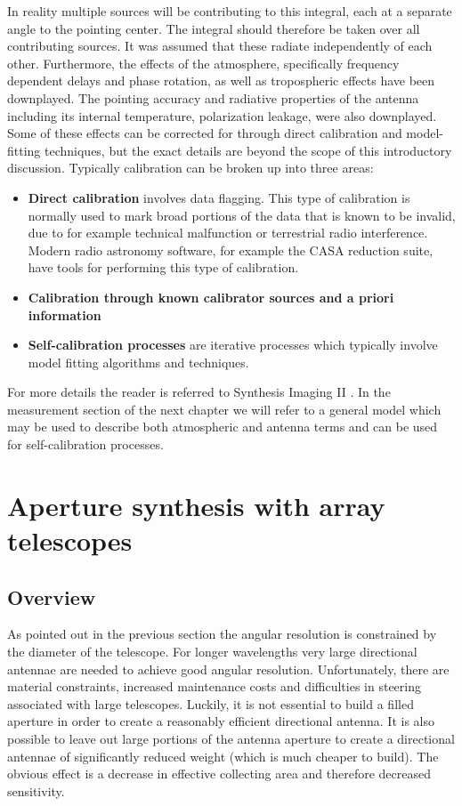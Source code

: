 In reality multiple sources will be contributing to this integral, each at a separate angle to the pointing center. The integral should therefore be taken over 
all contributing sources. It was assumed that these radiate independently of each other. Furthermore, the effects of the atmosphere, specifically frequency 
dependent delays and phase rotation, as well as tropospheric effects have been downplayed. The pointing accuracy and radiative properties of the antenna including its internal 
temperature, polarization leakage, were also downplayed. Some of these effects can be corrected for through direct calibration and model-fitting techniques, 
but the exact details are beyond the scope of this introductory discussion. Typically calibration can be broken up into three areas:
\begin{itemize}
 \item \textbf{Direct calibration} involves data flagging. This type of calibration is normally used to mark broad portions of the data that is known to be invalid, due to for example
 technical malfunction or terrestrial radio interference. Modern radio astronomy software, for example the CASA reduction suite, have tools for performing this type of calibration.
 \item \textbf{Calibration through known calibrator sources and a priori information} 
 \item \textbf{Self-calibration processes} are iterative processes which typically involve model fitting algorithms and techniques.
\end{itemize}

For more details the reader is referred to Synthesis Imaging II \cite[Lectures 3, 5, 8 and 10]{taylor1999synthesis}. In the measurement section of the next chapter
we will refer to a general model which may be used to describe both atmospheric and antenna terms and can be used for self-calibration processes.

\section{Aperture synthesis with array telescopes}
\subsection{Overview}
As pointed out in the previous section the angular resolution is constrained by the diameter of the telescope. For longer 
wavelengths very large directional antennae are needed to achieve good angular resolution. Unfortunately,
there are material constraints, increased maintenance costs and difficulties in steering associated with large telescopes. 
Luckily, it is not essential to build a filled aperture in order to create a reasonably efficient directional antenna. It is 
also possible to leave out large portions of the antenna aperture to create a directional antennae of significantly 
reduced weight (which is much cheaper to build). The obvious effect is a decrease in effective collecting area
and therefore decreased sensitivity.

